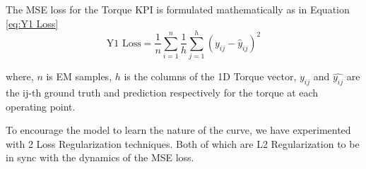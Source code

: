 \documentclass{report} %
\begin{document}
The \ac{MSE} loss for the Torque \ac{KPI} is formulated mathematically as in Equation \ref{eq:Y1 Loss}
\begin{equation}
    \text{Y1 Loss} = \frac{1}{n} \sum_{i=1}^{n} \frac{1}{h} \sum_{j=1}^{h} (y_{ij} - \hat{y}_{ij})^2
    \label{eq:Y1 Loss}
\end{equation} 


where, \(n\) is \ac{EM} samples, \(h\) is the columns of the 1D Torque vector, \(y_{ij}\) and $\hat{y_{ij}}$ are the ij-th ground truth and prediction respectively for 
the torque at each operating point.

To encourage the model to learn the nature of the curve, we have experimented with 2 Loss Regularization techniques. 
Both of which are L2 Regularization to be in sync with the dynamics of the \ac{MSE} loss.
\end{document}
